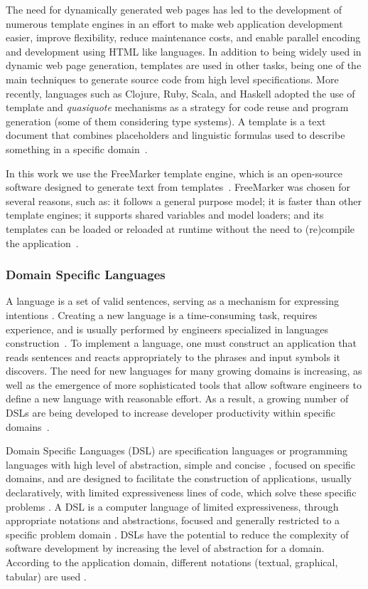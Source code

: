 \documentclass{bmcart}
\begin{document}
The need for dynamically generated web pages has led to the development of numerous template engines in an effort to make web application development easier, improve flexibility, reduce maintenance costs, and enable parallel encoding and development using HTML like languages. In addition to being widely used in dynamic web page generation, templates are used in other tasks, being one of the main techniques to generate source code from high level specifications. More recently, languages such as Clojure, Ruby, Scala, and Haskell adopted the use of template and \emph{quasiquote} mechanisms as a strategy for code reuse and program generation (some of them considering type systems). A template is a text document that combines placeholders and linguistic formulas used to describe something in a specific domain~\cite{segura2017}. 

In this work we use the FreeMarker template engine, which is an open-source software designed to generate text from templates~\cite{radjenovic2009}. FreeMarker was chosen for several reasons, such as: it follows a general purpose model; it is faster than other template engines; it supports shared variables and model loaders; and its templates can be loaded or reloaded at runtime without the need to (re)compile the application~\cite{benato2017,parr2006}.


\subsubsection*{Domain Specific Languages}
A language is a set of valid sentences, serving as a mechanism for expressing intentions \cite{parr2010}. Creating a new language is a time-consuming task, requires experience, and is usually performed by engineers specialized in languages construction~\cite{karsai2014}. To implement a language, one must construct an application that reads sentences and reacts appropriately to the phrases and input symbols it discovers. The need for new languages for many growing domains is increasing, as well as the emergence of more sophisticated tools that allow software engineers to define a new language with reasonable effort. As a result, a growing number of DSLs are being developed to increase developer productivity within specific domains~\cite{karsai2014}. 


Domain Specific Languages (DSL) are specification languages or programming languages with high level of abstraction, simple and concise \cite{raja2010}, focused on specific domains, and are designed to facilitate the construction of applications, usually declaratively, with limited expressiveness lines of code, which solve these specific problems \cite{neeraj2017}. A DSL is a computer language of limited expressiveness, through appropriate notations and abstractions, focused and generally restricted to a specific problem domain \cite{fowler2013,vanDeursen2000}. DSLs have the potential to reduce the complexity of software development by increasing the level of abstraction for a domain. According to the application domain, different notations (textual, graphical, tabular) are used \cite{pfeiffer2008}.
\end{document}
